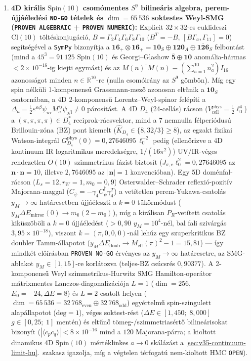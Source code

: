 \documentclass[11pt,a4paper]{article}
\begin{document}
{\begin{enumerate}\setlength{\itemsep}{2pt}
\item \textbf{4D királis $\mathrm{Spin}(10)$ csomómentes $S^9$ bilineáris algebra, perem-újjáéledési \texttt{NO-GO} tételek és $\dim=65\,536$ soktestes Weyl-SMG (\texttt{PROVEN ALGEBRAIC} + \texttt{PROVEN NUMERIC}):} Explicit $32\times 32$-es euklideszi $\mathrm{Cl}(10)$ töltéskonjugáció, $B = \Gamma_2\Gamma_4\Gamma_6\Gamma_8\Gamma_{10}$ ($B^T=-B$, $[B\Gamma_a,\Gamma_{11}]=0$) segítségével a \texttt{SymPy} bizonyítja a $\mathbf{16}_+\otimes\mathbf{16}_+ = \mathbf{10}_S\oplus\mathbf{120}_A\oplus\overline{\mathbf{126}}_S$ felbontást (mind a $45^3=91\,125$ $\mathrm{Spin}(10)$ és Georgi--Glashow $\bar{\mathbf{5}}\oplus\mathbf{10}$ anomália-hármas $<2\times 10^{-16}$-ig kiejti egymást) és az $M(n)^\dagger M(n) \equiv (\sum_{a=1}^{10}n_a^2)I_{16}$ azonosságot minden $n\in\mathbb{R}^{10}$-re (nulla csomóirány az $S^9$ gömbön). Míg egy spin nélküli 1-komponensű Grassmann-mező azonosan eltűnik a $\mathbf{10}_S$ csatornában, a 4D 2-komponensű Lorentz--Weyl-spinor felépíti a $\Delta_a = \frac{1}{2}\varepsilon^{\alpha\beta}\psi_{i\alpha}M_a^{ij}\psi_{j\beta}\neq 0$ párosítást. A 4D $D_4$ (24-cellás) rácson ($V_{\mathrm{cell}}^{\mathrm{phys}}=\frac{1}{2}\ell_0^4$) a $(\pi,\pi,\pi,\pi)\in D_4^*$ reciprok-rácsvektor, mind a $7$ nemnulla félperiódusú Brillouin-zóna (BZ) pont kiemelt ($\hat K_{D_4}\in\{8,32/3\}\ge 8$), az egzakt fizikai Watson-integrál $G_{D_4}^{\mathrm{phys}}(0)=0{,}27646095\,\ell_0^{-2}$ pedig (ellenőrizve a 4D kontinuum IR logaritmikus meredekségre, $1/(16\pi^2)$) UV/IR-véges rendezetlen $O(10)$ szimmetrikus fázist biztosít ($J_{\sigma,c}\ell_0^2 = 0{,}27646095$ az $\mathbf{n}\cdot\mathbf{n}=10$, illetve $2{,}7646095$ az $|\mathbf{n}|=1$ konvencióban). Egy 5D doménfal-rácson ($L_s=12, r_W=1, m_0=0{,}9$) Osterwalder--Schrader reflexió-pozitív Majorana-maggal ($C_{\bar\psi}=-\gamma_4 C_\psi^\dagger\gamma_4^T$) a vetítetlen perem-Yukawa-csatolás~\cite{GoltermanPetcherRivas1992} $y_M\to\infty$ határesetben újjáéleszti a $k=0$ tükörmódust ($y_M\Delta E_{\mathrm{mirror}}(0)\to m_0(2-m_0)$), míg a királisan $P_R$-vetített csatolás~\cite{WangWen2018} kiküszöböli a $k=0$ újjáéledést ($>0{,}90$ $y_M=10^4$-nél, bal fali szivárgás $3{,}95\times 10^{-18}$), viszont $k=(\pi,0,0,0)$-nál lehúz egy szuperkritikus BZ doubler Tamm-állapotot ($y_M\Delta E_{\mathrm{doub}}\to M_{\mathrm{eff}}(\pi)^2-1=15{,}81$) --- így mindkét előírásban \texttt{PROVEN NO-GO} érvényes az $y_M\to\infty$ határesetre, az SMG-ablakot $y_M\in[1,15]$-re korlátozva (teljes-BZ csúcsrés $0{,}90377$). A 2-komponensű Weyl szimmetrikus-Hurwitz SMG Hamilton-operátor mátrixmentes Lanczos-diagonalizációja $L=1$ ($\dim=256$, $E_0=-24, \Delta E=8$) és $L=2$ csatolt helyen ($\dim=65\,536 = 32\,768_{\mathrm{even}}\oplus 32\,768_{\mathrm{odd}}$) egyértelmű spin-szingulett alapállapotot ($\mathrm{deg}=1$), véges soktest-rést ($\Delta E\in[1{,}450;\;8{,}000]$ $g\in[0{,}25;\;1]$ mentén) és eltűnő tömeg-/szimmetriasértő bilineárisokat bizonyít ($|\langle c_p c_q\rangle|<8\times 10^{-16}$ mind a $120$ Majorana-párra; a kioltott dinamikus 4D $\mathrm{Spin}(10)$ mértéklinkes $a\to 0$ skálázást a \ref{sec:v35-continuum-limit-hu}.~szakasz igazolja, míg a végtelen térfogatú nem-kioltott HMC \texttt{OPEN}).

\end{enumerate}}
\end{document}

